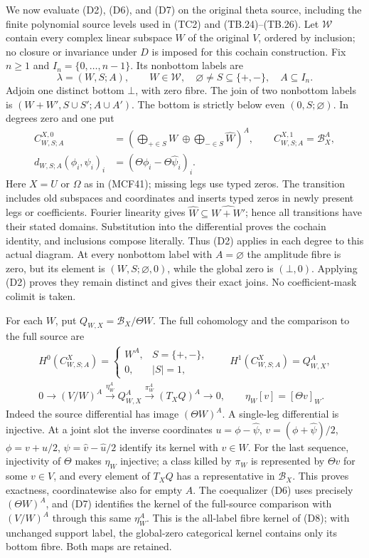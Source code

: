 We now evaluate (D2), (D6), and (D7) on the original theta source,
including the finite polynomial source levels used in (TC2) and
(TB.24)--(TB.26).  Let $\mathcal W$ contain every complex linear
subspace $W$ of the original $V$, ordered by inclusion; no closure
or invariance under $D$ is imposed for this cochain construction.
Fix $n\geq1$ and $I_n=\{0,\ldots,n-1\}$.  Its nonbottom labels are
\[
\lambda=(W,S;A),\qquad W\in\mathcal W,
\quad\varnothing\ne S\subseteq\{+,-\},\quad A\subseteq I_n.
\tag{D9}
\]
Adjoin one distinct bottom $\bot$, with zero fibre.  The join of two
nonbottom labels is $(W+W',S\cup S';A\cup A')$.  The bottom is
strictly below even $(0,S;\varnothing)$.  In degrees zero and one put
\[
\begin{split}
C_{W,S;A}^{X,0}&=
 \left(\bigoplus_{+\in S}W\ \oplus\!
       \bigoplus_{-\in S}\widehat W\right)^A,
\qquad C_{W,S;A}^{X,1}=\mathscr B_X^A,\\
d_{W,S;A}(\phi_i,\psi_i)_i&=(\Theta\phi_i-\Theta\widehat\psi_i)_i.
\end{split}
\tag{D10}
\]
Here $X=U$ or $\Omega$ as in (MCF41); missing legs use typed zeros.
The transition includes old subspaces and coordinates and inserts
typed zeros in newly present legs or coefficients.  Fourier
linearity gives $\widehat W\subseteq\widehat{W+W'}$; hence all
transitions have their stated domains.  Substitution into the
differential proves the cochain identity, and inclusions compose
literally.  Thus (D2) applies in each degree to this actual diagram.
At every nonbottom label with $A=\varnothing$ the amplitude fibre
is zero, but its element is $(W,S;\varnothing,0)$, while the global
zero is $(\bot,0)$.  Applying (D2) proves they remain distinct and
gives their exact joins.  No coefficient-mask colimit is taken.

For each $W$, put $Q_{W,X}=\mathscr B_X/\Theta W$.  The full
cohomology and the comparison to the full source are
\[
\begin{gathered}
H^0(C_{W,S;A}^X)=
 \begin{cases}W^A,&S=\{+,-\},\\0,&|S|=1,\end{cases}
\qquad H^1(C_{W,S;A}^X)=Q_{W,X}^A,\\
0\longrightarrow(V/W)^A\xrightarrow{\eta_W^A}Q_{W,X}^A
 \xrightarrow{\pi_W^A}(T_XQ)^A\longrightarrow0,
\qquad \eta_W[v]=[\Theta v]_W.
\tag{D11}
\end{gathered}
\]
Indeed the source differential has image $(\Theta W)^A$.  A
single-leg differential is injective.  At a joint slot the inverse
coordinates $u=\phi-\widehat\psi$, $v=(\phi+\widehat\psi)/2$,
$\phi=v+u/2$, $\psi=\widehat v-\widehat u/2$ identify its kernel
with $v\in W$.  For the last sequence, injectivity of $\Theta$
makes $\eta_W$ injective; a class killed by $\pi_W$ is represented
by $\Theta v$ for some $v\in V$, and every element of $T_XQ$ has
a representative in $\mathscr B_X$.  This proves exactness,
coordinatewise also for empty $A$.
The coequalizer (D6) uses precisely $(\Theta W)^A$, and (D7)
identifies the kernel of the full-source comparison with $(V/W)^A$
through this same $\eta_W^A$.  This is the all-label fibre kernel
of (D8); with unchanged support label, the global-zero categorical
kernel contains only its bottom fibre.  Both maps are retained.

